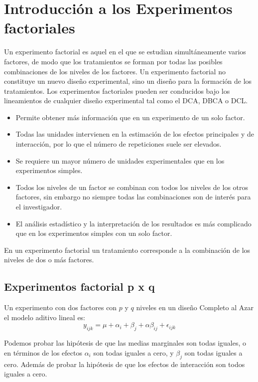 \documentclass[]{book}
\providecommand{\tightlist}{%
  \setlength{\itemsep}{0pt}\setlength{\parskip}{0pt}}
\begin{document}
\chapter{Introducción a los Experimentos
factoriales}\label{introduccion-a-los-experimentos-factoriales}

Un experimento factorial es aquel en el que se estudian simultáneamente
varios factores, de modo que los tratamientos se forman por todas las
posibles combinaciones de los niveles de los factores. Un experimento
factorial no constituye un nuevo diseño experimental, sino un diseño
para la formación de los tratamientos. Los experimentos factoriales
pueden ser conducidos bajo los lineamientos de cualquier diseño
experimental tal como el DCA, DBCA o DCL.

\begin{itemize}
\tightlist
\item
  Permite obtener más información que en un experimento de un solo
  factor.
\item
  Todas las unidades intervienen en la estimación de los efectos
  principales y de interacción, por lo que el número de repeticiones
  suele ser elevados.
\item
  Se requiere un mayor número de unidades experimentales que en los
  experimentos simples.
\item
  Todos los niveles de un factor se combinan con todos los niveles de
  los otros factores, sin embargo no siempre todas las combinaciones son
  de interés para el investigador.
\item
  El análisis estadístico y la interpretación de los resultados es más
  complicado que en los experimentos simples con un solo factor.
\end{itemize}

En un experimento factorial un tratamiento corresponde a la combinación
de los niveles de dos o más factores.

\section{Experimentos factorial p x
q}\label{experimentos-factorial-p-x-q}

Un experimento con dos factores con \(p\) y \(q\) niveles en un diseño
Completo al Azar el modelo aditivo lineal es:
\[y_{ijk}=\mu + \alpha_i+\beta_j+\alpha\beta_{ij}+\epsilon_{ijk}\]

Podemos probar las hipótesis de que las medias marginales son todas
iguales, o en términos de los efectos \(\alpha_i\) son todas iguales a
cero, y \(\beta_j\) son todas iguales a cero. Además de probar la
hipótesis de que los efectos de interacción son todos iguales a cero.
\end{document}
